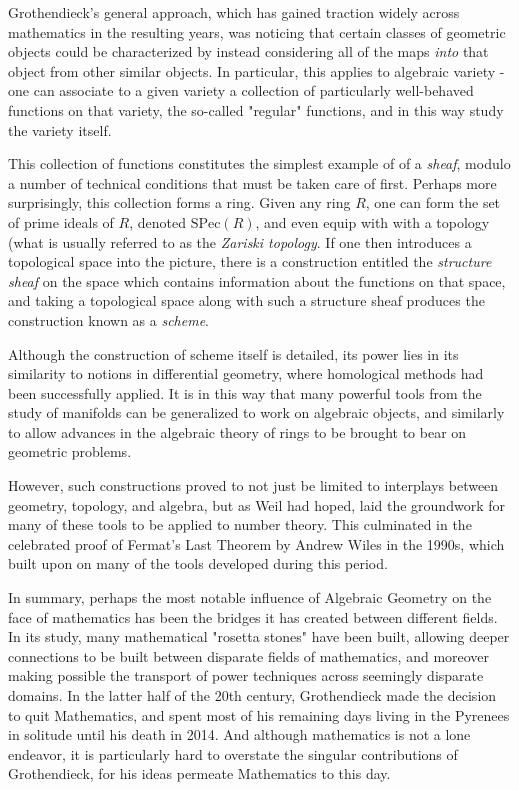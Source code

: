 \documentclass[]{article}
\begin{document}
Grothendieck's general approach, which has gained traction widely across
mathematics in the resulting years, was noticing that certain classes of
geometric objects could be characterized by instead considering all of
the maps \emph{into} that object from other similar objects. In
particular, this applies to algebraic variety - one can associate to a
given variety a collection of particularly well-behaved functions on
that variety, the so-called "regular" functions, and in this way study
the variety itself.

This collection of functions constitutes the simplest example of of a
\emph{sheaf}, modulo a number of technical conditions that must be taken
care of first. Perhaps more surprisingly, this collection forms a ring.
Given any ring \(R\), one can form the set of prime ideals of \(R\),
denoted \(\text{SPec}(R)\), and even equip with with a topology (what is
usually referred to as the \emph{Zariski topology}. If one then
introduces a topological space into the picture, there is a construction
entitled the \emph{structure sheaf} on the space which contains
information about the functions on that space, and taking a topological
space along with such a structure sheaf produces the construction known
as a \emph{scheme}.

Although the construction of scheme itself is detailed, its power lies
in its similarity to notions in differential geometry, where homological
methods had been successfully applied. It is in this way that many
powerful tools from the study of manifolds can be generalized to work on
algebraic objects, and similarly to allow advances in the algebraic
theory of rings to be brought to bear on geometric problems.

However, such constructions proved to not just be limited to interplays
between geometry, topology, and algebra, but as Weil had hoped, laid the
groundwork for many of these tools to be applied to number theory. This
culminated in the celebrated proof of Fermat's Last Theorem by Andrew
Wiles in the 1990s, which built upon on many of the tools developed
during this period.

In summary, perhaps the most notable influence of Algebraic Geometry on
the face of mathematics has been the bridges it has created between
different fields. In its study, many mathematical "rosetta stones" have
been built, allowing deeper connections to be built between disparate
fields of mathematics, and moreover making possible the transport of
power techniques across seemingly disparate domains. In the latter half
of the 20th century, Grothendieck made the decision to quit Mathematics,
and spent most of his remaining days living in the Pyrenees in solitude
until his death in 2014. And although mathematics is not a lone
endeavor, it is particularly hard to overstate the singular
contributions of Grothendieck, for his ideas permeate Mathematics to
this day.
\end{document}
